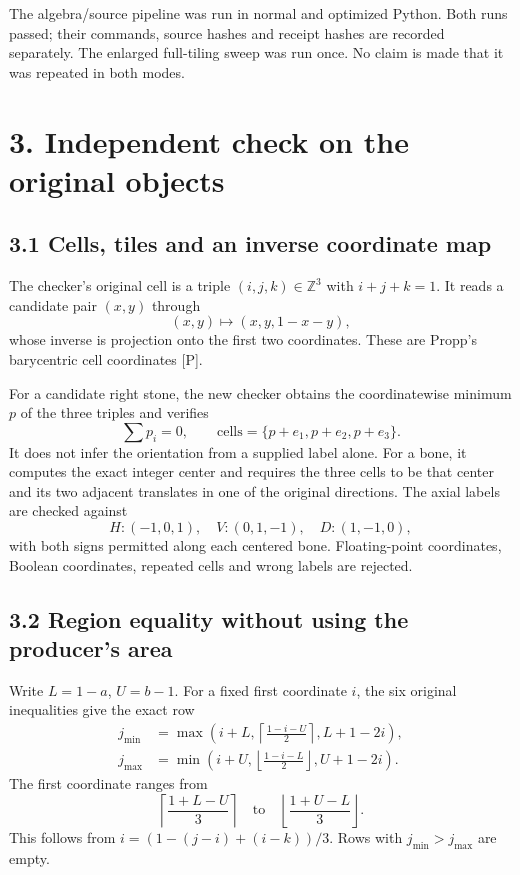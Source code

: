 \documentclass[
  11pt,
]{article}
\begin{document}
The algebra/source pipeline was run in normal and optimized Python. Both
runs passed; their commands, source hashes and receipt hashes are
recorded separately. The enlarged full-tiling sweep was run once. No
claim is made that it was repeated in both modes.

\section{3. Independent check on the original
objects}\label{independent-check-on-the-original-objects}

\subsection{3.1 Cells, tiles and an inverse coordinate
map}\label{cells-tiles-and-an-inverse-coordinate-map}

The checker's original cell is a triple \((i,j,k)\in\mathbb Z^3\) with
\(i+j+k=1\). It reads a candidate pair \((x,y)\) through \[
(x,y)\longmapsto (x,y,1-x-y),
\] whose inverse is projection onto the first two coordinates. These are
Propp's barycentric cell coordinates {[}P{]}.

For a candidate right stone, the new checker obtains the coordinatewise
minimum \(p\) of the three triples and verifies \[
\sum p_i=0,\qquad \text{cells}=\{p+e_1,p+e_2,p+e_3\}.
\] It does not infer the orientation from a supplied label alone. For a
bone, it computes the exact integer center and requires the three cells
to be that center and its two adjacent translates in one of the original
directions. The axial labels are checked against \[
H:(-1,0,1),\quad V:(0,1,-1),\quad D:(1,-1,0),
\] with both signs permitted along each centered bone. Floating-point
coordinates, Boolean coordinates, repeated cells and wrong labels are
rejected.

\subsection{3.2 Region equality without using the producer's
area}\label{region-equality-without-using-the-producers-area}

Write \(L=1-a\), \(U=b-1\). For a fixed first coordinate \(i\), the six
original inequalities give the exact row \[
\begin{split}
j_{\min}&=\max\left(i+L,\left\lceil\frac{1-i-U}{2}\right\rceil,L+1-2i\right),\\
j_{\max}&=\min\left(i+U,\left\lfloor\frac{1-i-L}{2}\right\rfloor,U+1-2i\right).
\end{split}
\] The first coordinate ranges from \[
\left\lceil\frac{1+L-U}{3}\right\rceil
\quad\text{to}\quad
\left\lfloor\frac{1+U-L}{3}\right\rfloor.
\] This follows from \(i=(1-(j-i)+(i-k))/3\). Rows with
\(j_{\min}>j_{\max}\) are empty.
\end{document}
